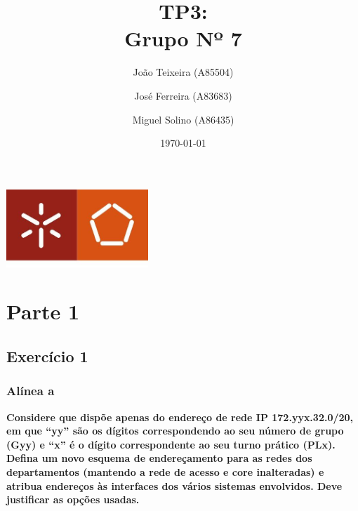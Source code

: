 \documentclass[a4paper]{report}
\begin{document}
\title{TP3:\\ 
\large Grupo Nº 7}
\author{João Teixeira (A85504) \and José Ferreira (A83683) \and Miguel Solino (A86435)}

\date{\today}

\begin{center}
    \begin{minipage}{0.75\linewidth}
        \centering
        \includegraphics[width=0.4\textwidth]{images/eng.jpeg}\par\vspace{1cm}
        \vspace{1cm}
        \href{https://www.uminho.pt/PT}
        {\color{black}{\scshape\LARGE Universidade do Minho}} \par
        \vspace{1cm}
        \href{https://www.di.uminho.pt/}
        {\color{black}{\scshape\Large Departamento de Informática}} \par
        \maketitle
    \end{minipage}
\end{center}

\tableofcontents

\pagebreak
\chapter{Parte 1}
\section{Exercício 1}
\subsection{Alínea a}
\textbf{Considere que dispõe apenas do endereço de rede IP 172.yyx.32.0/20, em
que “yy” são os dígitos correspondendo ao seu número de grupo (Gyy) e “x” é o
dígito correspondente ao seu turno prático (PLx). Defina um novo esquema de
endereçamento para as redes dos departamentos (mantendo a rede de acesso e core
inalteradas) e atribua endereços às interfaces dos vários sistemas envolvidos.
Deve justificar as opções usadas.}
\end{document}
